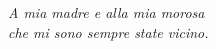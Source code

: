\cleardoublepage
\thispagestyle{empty}
\vspace*{\fill}
\vspace{1pc}
\begingroup\small
{}\textwidth
\begin{flushright}
  \textit{A mia madre e alla mia morosa\\ che mi sono sempre state vicino.}
\end{flushright}
\par\endgroup
\vspace{\fill}
\clearpage
